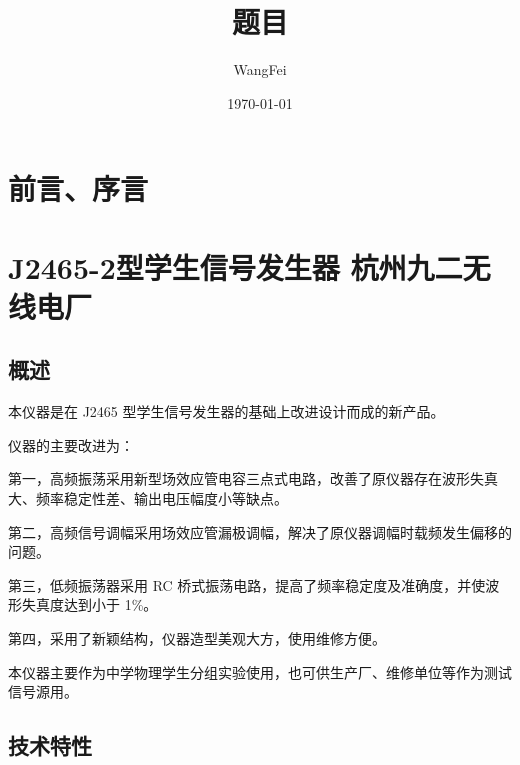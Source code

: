 \documentclass[12pt,UTF8]{ctexbook}
\title{\heiti\zihao{0} 题目}
\author{WangFei}
\date{\today}
\begin{document}
\maketitle
\tableofcontents

\frontmatter
\chapter{前言、序言}

\mainmatter

\chapter{J2465-2型学生信号发生器 杭州九二无线电厂}
	
\section{概述}

本仪器是在 J2465 型学生信号发生器的基础上改进设计而成的新产品。

仪器的主要改进为：

第一，高频振荡采用新型场效应管电容三点式电路，改善了原仪器存在波形失真大、频率稳定性差、输出电压幅度小等缺点。

第二，高频信号调幅采用场效应管漏极调幅，解决了原仪器调幅时载频发生偏移的问题。

第三，低频振荡器采用 RC 桥式振荡电路，提高了频率稳定度及准确度，并使波形失真度达到小于 1\%。

第四，采用了新颖结构，仪器造型美观大方，使用维修方便。

本仪器主要作为中学物理学生分组实验使用，也可供生产厂、维修单位等作为测试信号源用。
	
\section{技术特性}
\end{document}
